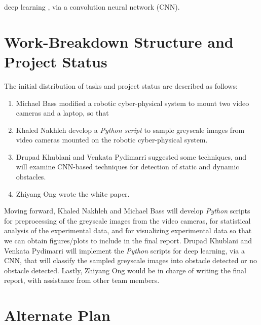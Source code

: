 \documentclass[letter,12pt]{article}
\begin{document}
deep learning \cite{Buduma2017,Ketkar2017,Pattanayak2017,Goodfellow2016,Wang2016,Bengio2015,Cho2014,Goodfellow2014,Ohlsson2011}, via a convolution neural network (CNN).






\section{Work-Breakdown Structure and Project Status}
\label{sec:WorkBreakdownStructureAndProjectStatus}

The initial distribution of tasks and project status are described as follows: \vspace{-0.3cm}
\begin{enumerate} \itemsep -4pt
\item Michael Bass modified a robotic cyber-physical system to mount two video cameras and a laptop, so that 
\item Khaled Nakhleh develop a {\it Python script} to sample greyscale images from video cameras mounted on the robotic cyber-physical system.
\item Drupad Khublani and Venkata Pydimarri suggested some techniques, and will examine CNN-based techniques for detection of static and dynamic obstacles.
\item Zhiyang Ong wrote the white paper.
\end{enumerate}

Moving forward, Khaled Nakhleh and Michael Bass will develop {\it Python} scripts for preprocessing of the greyscale images from the video cameras, for statistical analysis of the experimental data, and for visualizing experimental data so that we can obtain figures/plots to include in the final report. Drupad Khublani and Venkata Pydimarri will implement the {\it Python} scripts for deep learning, via a CNN, that will classify the sampled greyscale images into obstacle detected or no obstacle detected. Lastly, Zhiyang Ong would be in charge of writing the final report, with assistance from other team members.










\section{Alternate Plan}
\label{sec:AlternatePlan}
\end{document}
